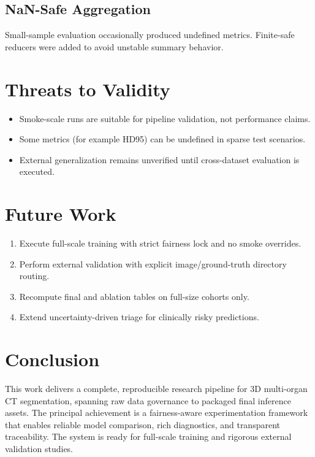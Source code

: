 \documentclass[11pt,a4paper]{article}
\begin{document}
\subsection{NaN-Safe Aggregation}
Small-sample evaluation occasionally produced undefined metrics. Finite-safe reducers were added to avoid unstable summary behavior.

\section{Threats to Validity}
\begin{itemize}
\item Smoke-scale runs are suitable for pipeline validation, not performance claims.
\item Some metrics (for example HD95) can be undefined in sparse test scenarios.
\item External generalization remains unverified until cross-dataset evaluation is executed.
\end{itemize}

\section{Future Work}
\begin{enumerate}
\item Execute full-scale training with strict fairness lock and no smoke overrides.
\item Perform external validation with explicit image/ground-truth directory routing.
\item Recompute final and ablation tables on full-size cohorts only.
\item Extend uncertainty-driven triage for clinically risky predictions.
\end{enumerate}

\section{Conclusion}
This work delivers a complete, reproducible research pipeline for 3D multi-organ CT segmentation, spanning raw data governance to packaged final inference assets. The principal achievement is a fairness-aware experimentation framework that enables reliable model comparison, rich diagnostics, and transparent traceability. The system is ready for full-scale training and rigorous external validation studies.
\end{document}

